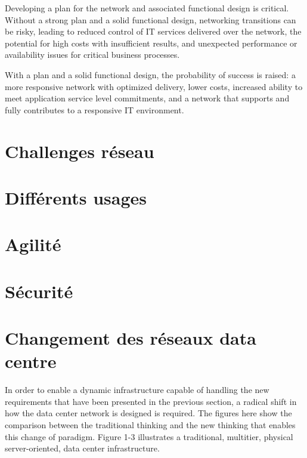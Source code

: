 Developing a plan for the network and associated functional design is critical. Without a strong plan and a solid functional design, networking transitions can be risky, leading to reduced control of IT services delivered over the network, the potential for high costs with insufficient results, and unexpected performance or availability issues for critical business processes.


With a plan and a solid functional design, the probability of success is raised: a more responsive network with optimized delivery, lower costs, increased ability to meet application service level commitments, and a network that supports and fully contributes to a responsive IT environment.

\section{Challenges réseau}


\section{Différents usages}

\section{Agilité}

\section{Sécurité}

\section{Changement des réseaux data centre}
In order to enable a dynamic infrastructure capable of handling the new requirements that have been presented in the previous section, a radical shift in how the data center network is designed is required.
The figures here show the comparison between the traditional thinking and the new thinking that enables this change of paradigm.
Figure 1-3 illustrates a traditional, multitier, physical server-oriented, data center infrastructure.


